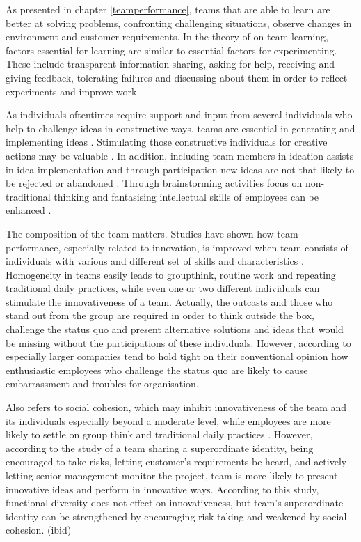 As presented in chapter \ref{teamperformance}, teams that are able to learn are better at solving problems, confronting challenging situations, observe changes in environment and customer requirements. In the theory of \citet{edmondson1999psychological} on team learning, factors essential for learning are similar to essential factors for experimenting. These include transparent information sharing, asking for help, receiving and giving feedback, tolerating failures and discussing about them in order to reflect experiments and improve work. \citep{edmondson1999psychological}

As individuals oftentimes require support and input from several individuals who help to challenge ideas in constructive ways, teams are essential in generating and implementing ideas \citep{mumford2002social}. Stimulating those constructive individuals for creative actions may be valuable \citep{robinson1997corporate}. In addition, including team members in ideation assists in idea implementation and through participation new ideas are not that likely to be rejected or abandoned \citep{agrell1994team}. Through brainstorming activities focus on non-traditional thinking and fantasising intellectual skills of employees can be enhanced \citep{sosik1998transformational}.

The composition of the team matters. Studies have shown how team performance, especially related to innovation, is improved when team consists of individuals with various and different set of skills and characteristics \citep{buijs2007innovation}. Homogeneity in teams easily leads to groupthink, routine work and repeating traditional daily practices, while even one or two different individuals can stimulate the innovativeness of a team. Actually, the outcasts and those who stand out from the group are required in order to think outside the box, challenge the status quo and present alternative solutions and ideas that would be missing without the participations of these individuals. \citep{sternberg1997creativity} However, according to \citet{quinn1985managing} especially larger companies tend to hold tight on their conventional opinion how enthusiastic employees who challenge the status quo are likely to cause embarrassment and troubles for organisation.

Also \citet{janis1982groupthink} refers to social cohesion, which may inhibit innovativeness of the team and its individuals especially beyond a moderate level, while employees are more likely to settle on group think and traditional daily practices . However, according to the study of \citet{sethi2001cross} a team sharing a superordinate identity, being encouraged to take risks, letting customer's requirements be heard, and actively letting senior management monitor the project, team is more likely to present innovative ideas and perform in innovative ways. According to this study, functional diversity does not effect on innovativeness, but team's superordinate identity can be strengthened by encouraging risk-taking and weakened by social cohesion. (ibid)

